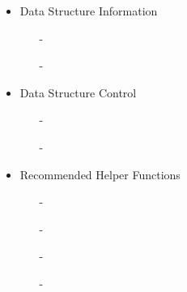 \begin{itemize}
\begin{itemize}
		      \item[-] 
	      \end{itemize}
	\item Data Structure Information
	      \begin{itemize}
		      \item[-] 
		      \item[-] 
	      \end{itemize}
	\item Data Structure Control
	      \begin{itemize}
		      \item[-] 
		      \item[-] 
	      \end{itemize}
	\item Recommended Helper Functions
	      \begin{itemize}
		      \item[-] 
		      \item[-] 
		      \item[-] 
		      \item[-] 
	      \end{itemize}
\end{itemize}
